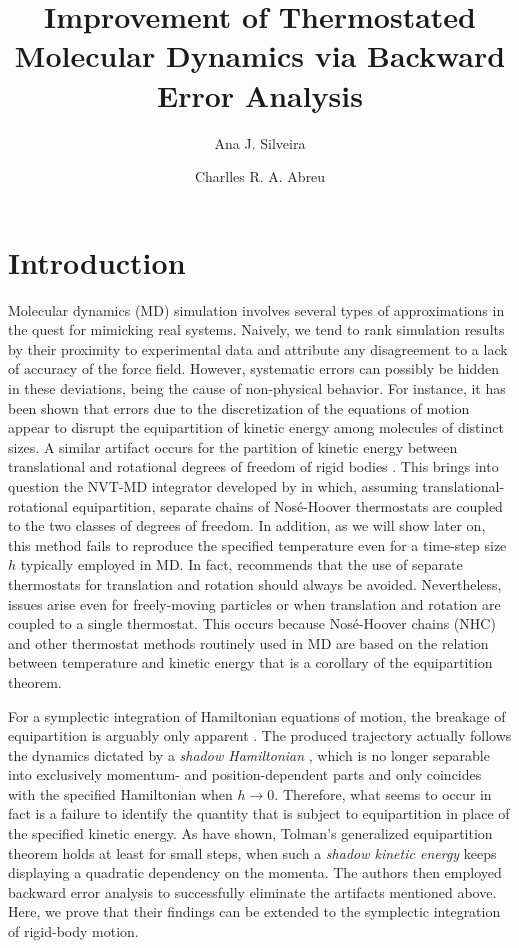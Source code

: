 \documentclass[
journal=jctcce,
layout=twocolumn
]{achemso}
\author{Ana J. Silveira}
\affiliation{Planta Piloto de Ingenier\'ia Qu\'imica, PLAPIQUI, Universidad Nacional del Sur, Camino La Carrindanga Km 7-CC: 717, Bah\'ia Blanca, Argentina}
\author{Charlles R. A. Abreu}
\affiliation{Chemical Engineering Department, Escola de Qu\'imica, Universidade Federal do Rio de Janeiro, Rio de Janeiro, RJ 21941-909, Brazil}
\title{Improvement of Thermostated Molecular Dynamics via Backward Error Analysis}
\newcommand{\timestep}{h}
\begin{document}


\section{Introduction}

Molecular dynamics (MD) simulation involves several types of approximations in the quest for mimicking real systems.
Naively, we tend to rank simulation results by their proximity to experimental data and attribute any disagreement to a lack of accuracy of the force field.
However, systematic errors can possibly be hidden in these deviations, being the cause of non-physical behavior.
For instance, it has been shown \cite{Eastwood_2010} that errors due to the discretization of the equations of motion appear to disrupt the equipartition of kinetic energy among molecules of distinct sizes.
A similar artifact occurs for the partition of kinetic energy between translational and rotational degrees of freedom of rigid bodies \cite{Davidchack_2010, Silveira_2017}.
This brings into question the NVT-MD integrator developed by \citeauthor{Kamberaj_2005} \cite{Kamberaj_2005} in which, assuming translational-rotational equipartition, separate chains of Nos\'{e}-Hoover thermostats are coupled to the two classes of degrees of freedom.
In addition, as we will show later on, this method fails to reproduce the specified temperature even for a time-step size $\timestep$ typically employed in MD.
In fact, \citeauthor{Davidchack_2010} \cite{Davidchack_2010} recommends that the use of separate thermostats for translation and rotation should always be avoided.
Nevertheless, issues arise even for freely-moving particles or when translation and rotation are coupled to a single thermostat.
This occurs because Nos\'{e}-Hoover chains (NHC) \cite{Martyna_1992} and other thermostat methods routinely used in MD are based on the relation between temperature and kinetic energy that is a corollary of the equipartition theorem.

For a symplectic integration of Hamiltonian equations of motion, the breakage of equipartition is arguably only apparent \cite{Eastwood_2010}.
The produced trajectory actually follows the dynamics dictated by a \textit{shadow Hamiltonian} \cite{Tuckerman_2010}, which is no longer separable into exclusively momentum- and position-dependent parts and only coincides with the specified Hamiltonian when $\timestep \to 0$.
Therefore, what seems to occur in fact is a failure to identify the quantity that is subject to equipartition in place of the specified kinetic energy.
As \citeauthor{Eastwood_2010} \cite{Eastwood_2010} have shown, Tolman's generalized equipartition theorem \cite{Tolman_1918} holds at least for small steps, when such a \textit{shadow kinetic energy} keeps displaying a quadratic dependency on the momenta.
The authors then employed backward error analysis to successfully eliminate the artifacts mentioned above.
Here, we prove that their findings can be extended to the symplectic integration of rigid-body motion.
\end{document}
